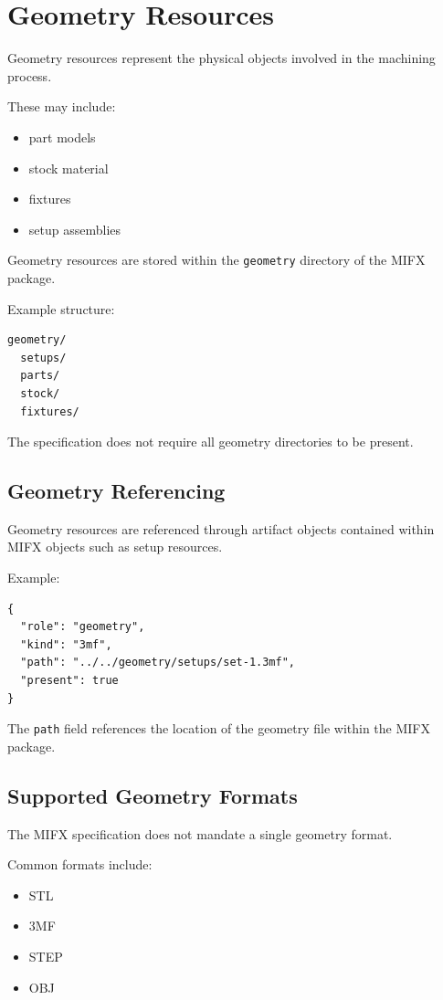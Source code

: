 \section{Geometry Resources}

Geometry resources represent the physical objects involved in the machining process.

These may include:

\begin{itemize}
\item part models
\item stock material
\item fixtures
\item setup assemblies
\end{itemize}

Geometry resources are stored within the \texttt{geometry} directory of the MIFX package.

Example structure:

\begin{verbatim}
geometry/
  setups/
  parts/
  stock/
  fixtures/
\end{verbatim}

The specification does not require all geometry directories to be present.

\subsection{Geometry Referencing}

Geometry resources are referenced through artifact objects contained within MIFX objects such as setup resources.

Example:

\begin{verbatim}
{
  "role": "geometry",
  "kind": "3mf",
  "path": "../../geometry/setups/set-1.3mf",
  "present": true
}
\end{verbatim}

The \texttt{path} field references the location of the geometry file within the MIFX package.

\subsection{Supported Geometry Formats}

The MIFX specification does not mandate a single geometry format.

Common formats include:

\begin{itemize}
\item STL
\item 3MF
\item STEP
\item OBJ
\end{itemize}

